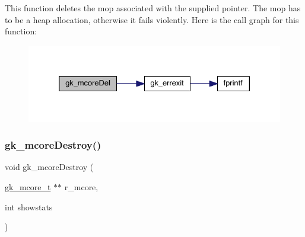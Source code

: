 This function deletes the mop associated with the supplied pointer. The mop has to be a heap allocation, otherwise it fails violently. Here is the call graph for this function\+:\nopagebreak
\begin{figure}[H]
\begin{center}
\leavevmode
\includegraphics[width=330pt]{a00077_a0e63861ea56a62080a63408af43a9075_cgraph}
\end{center}
\end{figure}
\mbox{\label{a00077_acecd8b70b01b2b365695f034967c9536}} 
\subsubsection{\texorpdfstring{gk\+\_\+mcore\+Destroy()}{gk\_mcoreDestroy()}}
{\footnotesize\ttfamily void gk\+\_\+mcore\+Destroy (\begin{DoxyParamCaption}\item[{\hyperlink{a00682}{gk\+\_\+mcore\+\_\+t} $\ast$$\ast$}]{r\+\_\+mcore,  }\item[{int}]{showstats }\end{DoxyParamCaption})}

